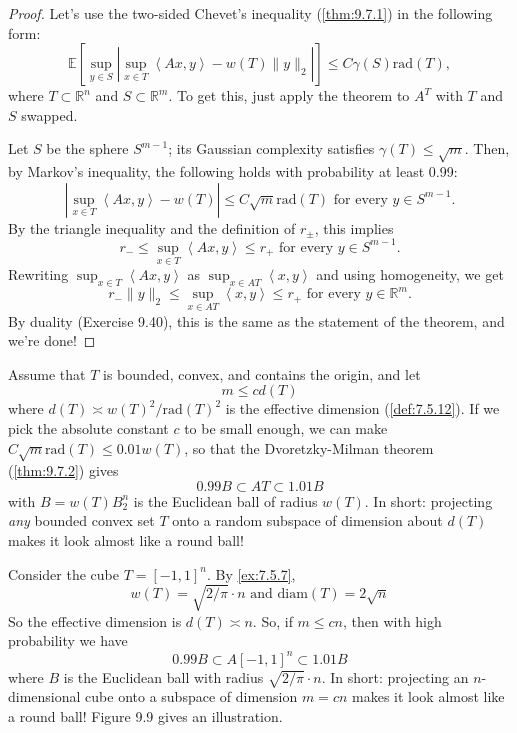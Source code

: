 \begin{proof}
Let's use the two-sided Chevet's inequality (\cref{thm:9.7.1}) in the following form:
\[ \mathbb{E}\left[ \sup_{y \in S} \left| \sup_{x \in T}\left\langle Ax, y \right\rangle - w(T) \lVert y 
\rVert_{2} \right| \right] \leq C \gamma(S) \mathrm{rad}(T), \]
where $T \subset \mathbb{R}^n$ and $S \subset \mathbb{R}^m$. To get this, just apply the theorem to $A^T$ with 
$T$ and $S$ swapped.

Let $S$ be the sphere $S^{m - 1}$; its Gaussian complexity satisfies $\gamma(T) \leq \sqrt{m}$. Then, by 
Markov's inequality, the following holds with probability at least 0.99:
\[ \left| \sup_{x \in T}\left\langle Ax, y \right\rangle - w(T) \right| \leq C \sqrt{m} \mathrm{rad}(T) 
\text{ for every } y \in S^{m -1}. \]
By the triangle inequality and the definition of $r_{\pm}$, this implies 
\[ r_- \leq \sup_{x \in T}\left\langle Ax, y \right\rangle \leq r_+ \text{ for every } y \in S^{m - 1}. \]
Rewriting $\sup_{x \in T}\left\langle Ax, y \right\rangle$ as $\sup_{x \in AT}\left\langle x, y \right\rangle$ 
and using homogeneity, we get 
\[ r_- \lVert y \rVert_{2} \leq \sup_{x \in AT}\left\langle x, y \right\rangle \leq r_+ \text{ for every } 
y \in \mathbb{R}^m. \]
By duality (Exercise 9.40), this is the same as the statement of the theorem, and we're done!
\end{proof}

\begin{remark}
\label{rmk:9.7.3}
Assume that $T$ is bounded, convex, and contains the origin, and let 
\[ m \leq c d(T) \]
where $d(T) \asymp w(T)^2 / \mathrm{rad}(T)^2$ is the effective dimension (\cref{def:7.5.12}). If we pick the 
absolute constant $c$ to be small enough, we can make $C \sqrt{m} \mathrm{rad}(T) \leq 0.01 w(T)$, so that 
the Dvoretzky-Milman theorem (\cref{thm:9.7.2}) gives
\[ 0.99B \subset AT \subset 1.01B \]
with $B = w(T) B_2^n$ is the Euclidean ball of radius $w(T)$. In short: projecting \textit{any} bounded convex 
set $T$ onto a random subspace of dimension about $d(T)$ makes it look almost like a round ball!
\end{remark}

\begin{example}
\label{ex:9.7.4}
Consider the cube $T = [-1, 1]^n$. By \cref{ex:7.5.7}, 
\[ w(T) = \sqrt{2/\pi} \cdot n \text{ and } \mathrm{diam}(T) = 2 \sqrt{n} \]
So the effective dimension is $d(T) \asymp n$. So, if $m \leq cn$, then with high probability we have 
\[ 0.99B \subset A[-1, 1]^n \subset 1.01B \]
where $B$ is the Euclidean ball with radius $\sqrt{2/\pi} \cdot n$. In short: projecting an $n$-dimensional cube 
onto a subspace of dimension $m = cn$ makes it look almost like a round ball! Figure 9.9 gives an illustration.
\end{example}

